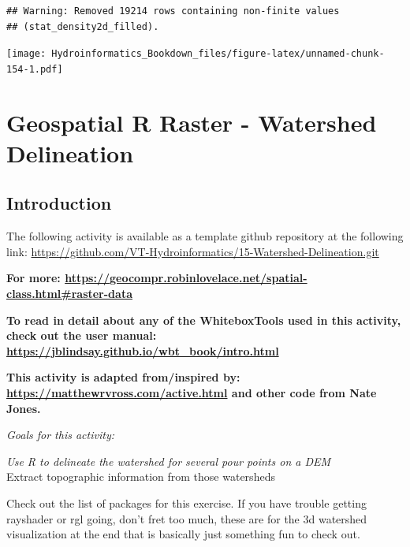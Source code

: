 \documentclass[
]{book}
\newenvironment{Shaded}{\begin{snugshade}}{\end{snugshade}}
\newcommand{\AttributeTok}[1]{\textcolor[rgb]{0.77,0.63,0.00}{#1}}
\newcommand{\CommentTok}[1]{\textcolor[rgb]{0.56,0.35,0.01}{\textit{#1}}}
\newcommand{\FunctionTok}[1]{\textcolor[rgb]{0.00,0.00,0.00}{#1}}
\newcommand{\NormalTok}[1]{#1}
\newcommand{\SpecialCharTok}[1]{\textcolor[rgb]{0.00,0.00,0.00}{#1}}
\begin{document}
\begin{verbatim}
## Warning: Removed 19214 rows containing non-finite values
## (stat_density2d_filled).
\end{verbatim}

\texttt{[image: Hydroinformatics\_Bookdown\_files/figure-latex/unnamed-chunk-154-1.pdf]}

\hypertarget{rgeowatersheds}{%
\chapter{Geospatial R Raster - Watershed Delineation}\label{rgeowatersheds}}

\hypertarget{introduction-3}{%
\section{Introduction}\label{introduction-3}}

The following activity is available as a template github repository at the following link: \url{https://github.com/VT-Hydroinformatics/15-Watershed-Delineation.git}

\textbf{For more: \url{https://geocompr.robinlovelace.net/spatial-class.html\#raster-data}}

\textbf{To read in detail about any of the WhiteboxTools used in this activity, check out the user manual: \url{https://jblindsay.github.io/wbt_book/intro.html}}

\textbf{This activity is adapted from/inspired by: \url{https://matthewrvross.com/active.html} and other code from Nate Jones.}

\emph{Goals for this activity:}

\emph{Use R to delineate the watershed for several pour points on a DEM\\
}Extract topographic information from those watersheds

Check out the list of packages for this exercise. If you have trouble getting rayshader or rgl going, don't fret too much, these are for the 3d watershed visualization at the end that is basically just something fun to check out.

\begin{Shaded}
\end{Shaded}
\end{document}
